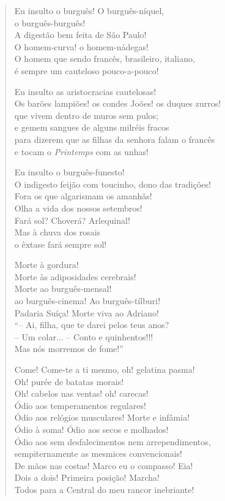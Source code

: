 \begin{verse}
Eu insulto o burguês! O burguês-níquel,\\
o burguês-burguês!\\
A digestão bem feita de São Paulo!\\
O homem-curva! o homem-nádegas!\\
O homem que sendo francês, brasileiro, italiano,\\
é sempre um cauteloso pouco-a-pouco!

Eu insulto as aristocracias cautelosas!\\
Os barões lampiões! os condes Joões! os duques zurros!\\
que vivem dentro de muros sem pulos;\\
e gemem sangues de alguns milréis fracos\\
para dizerem que as filhas da senhora falam o francês\\
e tocam o \emph{Printemps} com as unhas!

Eu insulto o burguês-funesto!\\
O indigesto feijão com toucinho, dono das tradições!\\
Fora os que algarismam os amanhãs!\\
Olha a vida dos nossos setembros!\\
Fará sol? Choverá? Arlequinal!\\
Mas à chuva dos rosais\\
o êxtase fará sempre sol!

Morte à gordura!\\
Morte às adiposidades cerebrais!\\
Morte ao burguês-mensal!\\
ao burguês-cinema! Ao burguês-tílburi!\\
Padaria Suíça! Morte viva ao Adriano!\\
``-- Ai, filha, que te darei pelos teus anos?\\
-- Um colar... -- Conto e quinhentos!!!\\
Mas nós morremos de fome!''

Come! Come-te a ti mesmo, oh! gelatina pasma!\\
Oh! purée de batatas morais!\\
Oh! cabelos nas ventas! oh! carecas!\\
Ódio aos temperamentos regulares!\\
Ódio aos relógios musculares! Morte e infâmia!\\
Ódio à soma! Ódio aos secos e molhados!\\
Ódio aos sem desfalecimentos nem arrependimentos,\\
sempiternamente as mesmices convencionais!\\
De mãos nas costas! Marco eu o compasso! Eia!\\
Dois a dois! Primeira posição! Marcha!\\
Todos para a Central do meu rancor inebriante!


\end{verse}
